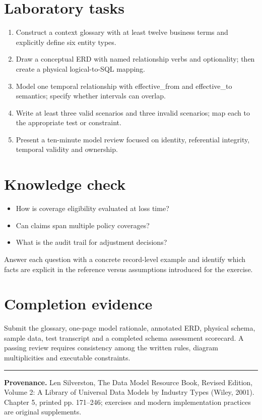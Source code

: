 \documentclass[11pt,letterpaper]{article}
\begin{document}
\section{Laboratory tasks}
\begin{enumerate}
\item Construct a context glossary with at least twelve business terms and explicitly define six entity types.
\item Draw a conceptual ERD with named relationship verbs and optionality; then create a physical logical-to-SQL mapping.
\item Model one temporal relationship with effective\_from and effective\_to semantics; specify whether intervals can overlap.
\item Write at least three valid scenarios and three invalid scenarios; map each to the appropriate test or constraint.
\item Present a ten-minute model review focused on identity, referential integrity, temporal validity and ownership.
\end{enumerate}

\section{Knowledge check}
\begin{itemize}
\item How is coverage eligibility evaluated at loss time?
\item Can claims span multiple policy coverages?
\item What is the audit trail for adjustment decisions?
\end{itemize}
Answer each question with a concrete record-level example and identify which facts are explicit in the reference versus assumptions introduced for the exercise.


\section{Completion evidence}
Submit the glossary, one-page model rationale, annotated ERD, physical schema, sample data, test transcript and a completed schema assessment scorecard. A passing review requires consistency among the written rules, diagram multiplicities and executable constraints.


\vfill
\hrule
{\footnotesize\textbf{Provenance.} Len Silverston, The Data Model Resource Book, Revised Edition, Volume 2: A Library of Universal Data Models by Industry Types (Wiley, 2001). Chapter 5, printed pp. 171--246; exercises and modern implementation practices are original supplements.}
\end{document}
